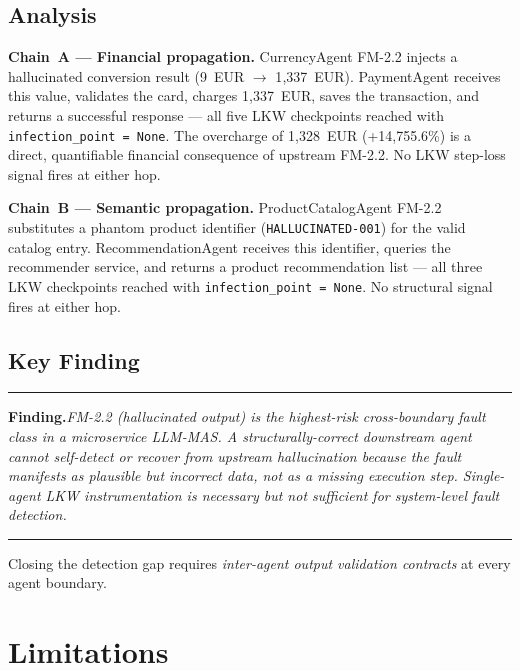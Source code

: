 \documentclass[conference]{IEEEtran}
\begin{document}
\subsection{Analysis}

\textbf{Chain~A --- Financial propagation.}
CurrencyAgent FM-2.2 injects a hallucinated conversion result
(9~EUR $\rightarrow$ 1{,}337~EUR). PaymentAgent receives this value, validates
the card, charges 1{,}337~EUR, saves the transaction, and returns a successful
response --- all five LKW checkpoints reached with \texttt{infection\_point = None}.
The overcharge of 1{,}328~EUR (+14{,}755.6\%) is a direct, quantifiable financial
consequence of upstream FM-2.2. No LKW step-loss signal fires at either hop.

\textbf{Chain~B --- Semantic propagation.}
ProductCatalogAgent FM-2.2 substitutes a phantom product identifier
(\texttt{HALLUCINATED-001}) for the valid catalog entry. RecommendationAgent
receives this identifier, queries the recommender service, and returns a product
recommendation list --- all three LKW checkpoints reached with
\texttt{infection\_point = None}. No structural signal fires at either hop.

\subsection{Key Finding}

\medskip
\noindent\rule{\columnwidth}{0.5pt}

\smallskip\noindent\textbf{Finding.}\;\textit{FM-2.2 (hallucinated output) is
the highest-risk cross-boundary fault class in a microservice LLM-MAS. A
structurally-correct downstream agent cannot self-detect or recover from
upstream hallucination because the fault manifests as plausible but incorrect
data, not as a missing execution step. Single-agent LKW instrumentation is
necessary but not sufficient for system-level fault detection.}\smallskip

\noindent\rule{\columnwidth}{0.5pt}
\medskip

Closing the detection gap requires \emph{inter-agent output validation
contracts} at every agent boundary.

\section{Limitations}
\label{sec:limitations}
\end{document}
